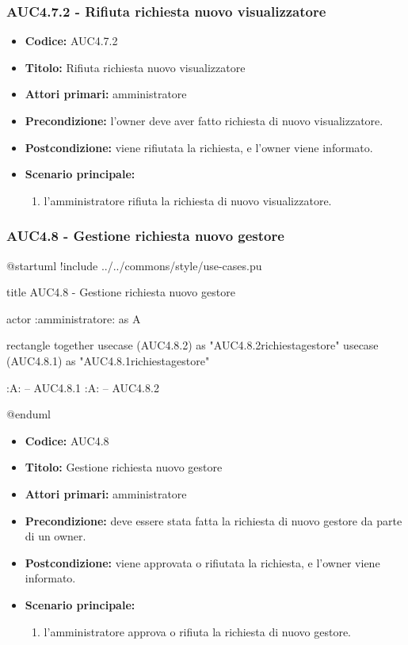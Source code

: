 \documentclass[casi-duso]{subfiles}
\begin{document}
\subsubsection{AUC4.7.2 - Rifiuta richiesta nuovo visualizzatore}%
\label{subsub:AUC4.7.2}
\begin{itemize}
  \item \textbf{Codice:} AUC4.7.2
  \item \textbf{Titolo:} Rifiuta richiesta nuovo visualizzatore
  \item \textbf{Attori primari:} amministratore
  \item \textbf{Precondizione:} l'owner deve aver fatto richiesta di nuovo visualizzatore.
  \item \textbf{Postcondizione:} viene rifiutata la richiesta, e l'owner viene informato.
  \item \textbf{Scenario principale:}
  \begin{enumerate}
    \item l'amministratore rifiuta la richiesta di nuovo visualizzatore.
  \end{enumerate}
\end{itemize}  

\subsubsection{AUC4.8 - Gestione richiesta nuovo gestore}%
\label{subsub:AUC4.8}

\begin{plantuml}
@startuml
!include ../../commons/style/use-cases.pu

title AUC4.8 - Gestione richiesta nuovo gestore

actor :amministratore: as A

rectangle {
  together {
    usecase (AUC4.8.2) as "AUC4.8.2\nRifiuta richiesta\nnuovo gestore"
    usecase (AUC4.8.1) as "AUC4.8.1\nAccetta richiesta\nnuovo gestore"
  }
}

:A: -- AUC4.8.1
:A: -- AUC4.8.2

@enduml
\end{plantuml}

\begin{itemize}
  \item \textbf{Codice:} AUC4.8
  \item \textbf{Titolo:} Gestione richiesta nuovo gestore
  \item \textbf{Attori primari:} amministratore
  \item \textbf{Precondizione:} deve essere stata fatta la richiesta di nuovo gestore da parte di un owner.
  \item \textbf{Postcondizione:} viene approvata o rifiutata la richiesta, e l'owner viene informato.
  \item \textbf{Scenario principale:}
  \begin{enumerate}
    \item l'amministratore approva o rifiuta la richiesta di nuovo gestore.
  \end{enumerate}
\end{itemize}
\end{document}
